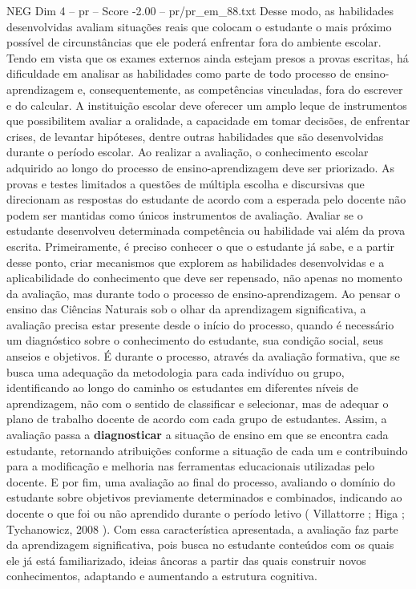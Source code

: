 \begin{textsample}{NEG Dim 4 – pr – Score -2.00 – pr/pr\_em\_88.txt}
Desse modo, as habilidades desenvolvidas avaliam situações reais que colocam o estudante o mais próximo possível de circunstâncias que ele poderá enfrentar fora do ambiente escolar.
Tendo em vista que os exames externos ainda estejam presos a provas escritas, há dificuldade em analisar as habilidades como parte de todo processo de ensino-aprendizagem e, consequentemente, as competências vinculadas, fora do escrever e do calcular.
A instituição escolar deve oferecer um amplo leque de instrumentos que possibilitem avaliar a oralidade, a capacidade em tomar decisões, de enfrentar crises, de levantar hipóteses, dentre outras habilidades que são desenvolvidas durante o período escolar.
Ao realizar a avaliação, o conhecimento escolar adquirido ao longo do processo de ensino-aprendizagem deve ser priorizado.
As provas e testes limitados a questões de múltipla escolha e discursivas que direcionam as respostas do estudante de acordo com a esperada pelo docente não podem ser mantidas como únicos instrumentos de avaliação.
Avaliar se o estudante desenvolveu determinada competência ou habilidade vai além da prova escrita.
Primeiramente, é preciso conhecer o que o estudante já sabe, e a partir desse ponto, criar mecanismos que explorem as habilidades desenvolvidas e a aplicabilidade do conhecimento que deve ser repensado, não apenas no momento da avaliação, mas durante todo o processo de ensino-aprendizagem.
Ao pensar o ensino das Ciências Naturais sob o olhar da aprendizagem significativa, a avaliação precisa estar presente desde o início do processo, quando é necessário um diagnóstico sobre o conhecimento do estudante, sua condição social, seus anseios e objetivos.
É durante o processo, através da avaliação formativa, que se busca uma adequação da metodologia para cada indivíduo ou grupo, identificando ao longo do caminho os estudantes em diferentes níveis de aprendizagem, não com o sentido de classificar e selecionar, mas de adequar o plano de trabalho docente de acordo com cada grupo de estudantes.
Assim, a avaliação passa a \textbf{diagnosticar} a situação de ensino em que se encontra cada estudante, retornando atribuições conforme a situação de cada um e contribuindo para a modificação e melhoria nas ferramentas educacionais utilizadas pelo docente.
E por fim, uma avaliação ao final do processo, avaliando o domínio do estudante sobre objetivos previamente determinados e combinados, indicando ao docente o que foi ou não aprendido durante o período letivo ( Villattorre ; Higa ; Tychanowicz, 2008 ).
Com essa característica apresentada, a avaliação faz parte da aprendizagem significativa, pois busca no estudante conteúdos com os quais ele já está familiarizado, ideias âncoras a partir das quais construir novos conhecimentos, adaptando e aumentando a estrutura cognitiva.

\end{textsample}
